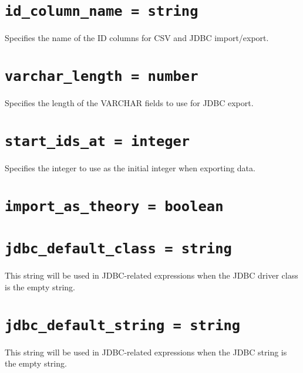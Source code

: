 \documentclass[10pt]{book}
\begin{document}
%

%
%
%
\section{{\tt id\_column\_name = string}}
Specifies the name of the ID columns for CSV and JDBC import/export.

\section{{\tt varchar\_length = number}}
Specifies the length of the VARCHAR fields to use for JDBC export.

\section{ {\tt start\_ids\_at = integer}}

Specifies the integer to use as the initial integer when exporting data.

\section{ {\tt import\_as\_theory = boolean}}

\section{ {\tt jdbc\_default\_class = string } }

This string will be used in JDBC-related expressions when the JDBC driver class is the empty string.

\section{ {\tt jdbc\_default\_string = string } }

This string will be used in JDBC-related expressions when the JDBC string is the empty string.
\end{document}
